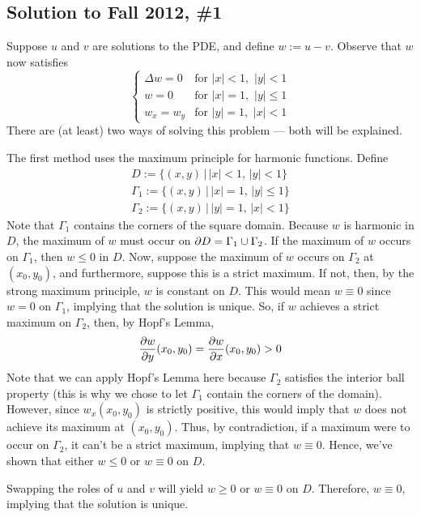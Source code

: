 \subsection*{Solution to Fall 2012, \#1}
\label{F12Q1}

Suppose $u$ and $v$ are solutions to the PDE, and define $w:=u-v$. Observe that $w$ now satisfies
$$ \left\{
\begin{array}{ll}
	\Delta w = 0 & \text{for} \,\, |x| < 1, \,\, |y| < 1 \\
	w = 0 & \text{for} \,\, |x| = 1, \,\, |y| \leq 1 \\
	w_x = w_y & \text{for} \,\, |y| = 1, \,\, |x| < 1
\end{array}
\right.
$$
There are (at least) two ways of solving this problem --- both will be explained.

The first method uses the maximum principle for harmonic functions. Define
\begin{gather*}
	D := \{ (x,y) \, | \, |x| < 1, \, |y| < 1 \} \\
	\Gamma_1 := \{ (x,y) \, | \, |x|=1, \, |y| \leq 1 \} \\
	\Gamma_2 := \{ (x,y) \, | \, |y|=1, \, |x|<1 \}
\end{gather*}
Note that $\Gamma_1$ contains the corners of the square domain. Because $w$ is harmonic in $D$, the maximum of $w$ must occur on $\partial D = \Gamma_1 \cup \Gamma_2$. If the maximum of $w$ occurs on $\Gamma_1$, then $w \leq 0$ in $D$. Now, suppose the maximum of $w$ occurs on $\Gamma_2$ at $(x_0,y_0)$, and furthermore, suppose this is a strict maximum. If not, then, by the strong maximum principle, $w$ is constant on $D$. This would mean $w \equiv 0$ since $w = 0$ on $\Gamma_1$, implying that the solution is unique. So, if $w$ achieves a strict maximum on $\Gamma_2$, then, by Hopf's Lemma,
$$\frac{\partial w}{\partial y}(x_0,y_0) = \frac{\partial w}{\partial x}(x_0,y_0) > 0 $$
Note that we can apply Hopf's Lemma here because $\Gamma_2$ satisfies the interior ball property (this is why we chose to let $\Gamma_1$ contain the corners of the domain). However, since $w_x(x_0,y_0)$ is strictly positive, this would imply that $w$ does not achieve its maximum at $(x_0,y_0)$. Thus, by contradiction, if a maximum were to occur on $\Gamma_2$, it can't be a strict maximum, implying that $w \equiv 0$. Hence, we've shown that either $w \leq 0$ or $w \equiv 0$ on $D$.

Swapping the roles of $u$ and $v$ will yield $w \geq 0$ or $w \equiv 0$ on $D$. Therefore, $w \equiv 0$, implying that the solution is unique.

